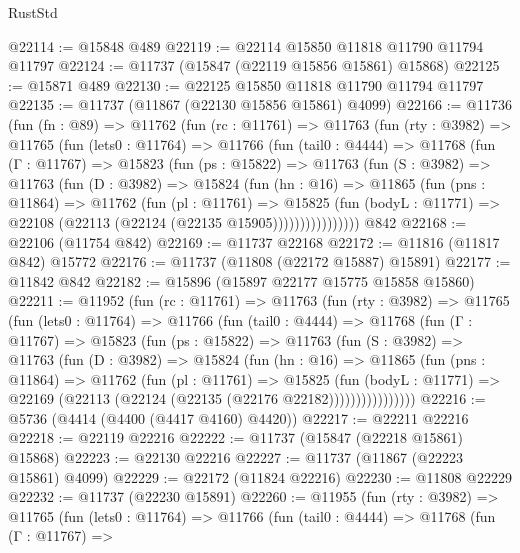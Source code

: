 \begin{lexlean}{RustStd}
\begin{coremodule}
@22114 := @15848 @489
@22119 := @22114 @15850 @11818 @11790 @11794 @11797
@22124 := @11737 (@15847 (@22119 @15856 @15861) @15868)
@22125 := @15871 @489
@22130 := @22125 @15850 @11818 @11790 @11794 @11797
@22135 := @11737 (@11867 (@22130 @15856 @15861) @4099)
@22166 := @11736
    (fun (fn : @89) =>
    @11762
      (fun (rc : @11761) =>
      @11763
        (fun (rty : @3982) =>
        @11765
          (fun (lets0 : @11764) =>
          @11766
            (fun (tail0 : @4444) =>
            @11768
              (fun (Γ : @11767) =>
              @15823
                (fun (ps : @15822) =>
                @11763
                  (fun (S : @3982) =>
                  @11763
                    (fun (D : @3982) =>
                    @15824
                      (fun (hn : @16) =>
                      @11865
                        (fun (pns : @11864) =>
                        @11762
                          (fun (pl : @11761) =>
                          @15825
                            (fun (bodyL : @11771) =>
                            @22108 (@22113 (@22124 (@22135 @15905))))))))))))))))
    @842
@22168 := @22106 (@11754 @842)
@22169 := @11737 @22168
@22172 := @11816 (@11817 @842) @15772
@22176 := @11737 (@11808 (@22172 @15887) @15891)
@22177 := @11842 @842
@22182 := @15896 (@15897 @22177 @15775 @15858 @15860)
@22211 := @11952
    (fun (rc : @11761) =>
    @11763
      (fun (rty : @3982) =>
      @11765
        (fun (lets0 : @11764) =>
        @11766
          (fun (tail0 : @4444) =>
          @11768
            (fun (Γ : @11767) =>
            @15823
              (fun (ps : @15822) =>
              @11763
                (fun (S : @3982) =>
                @11763
                  (fun (D : @3982) =>
                  @15824
                    (fun (hn : @16) =>
                    @11865
                      (fun (pns : @11864) =>
                      @11762
                        (fun (pl : @11761) =>
                        @15825
                          (fun (bodyL : @11771) =>
                          @22169 (@22113 (@22124 (@22135 (@22176 @22182))))))))))))))))
@22216 := @5736 (@4414 (@4400 (@4417 @4160) @4420))
@22217 := @22211 @22216
@22218 := @22119 @22216
@22222 := @11737 (@15847 (@22218 @15861) @15868)
@22223 := @22130 @22216
@22227 := @11737 (@11867 (@22223 @15861) @4099)
@22229 := @22172 (@11824 @22216)
@22230 := @11808 @22229
@22232 := @11737 (@22230 @15891)
@22260 := @11955
    (fun (rty : @3982) =>
    @11765
      (fun (lets0 : @11764) =>
      @11766
        (fun (tail0 : @4444) =>
        @11768
          (fun (Γ : @11767) =>

\end{coremodule}
\end{lexlean}
